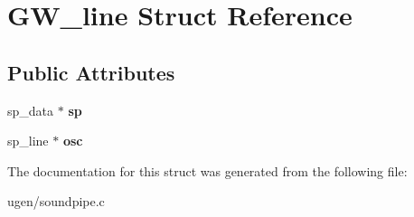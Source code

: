\hypertarget{structGW__line}{}\section{G\+W\+\_\+line Struct Reference}
\label{structGW__line}
\subsection*{Public Attributes}
\begin{DoxyCompactItemize}
\item 
\hypertarget{structGW__line_a1375b2661bb6d049fbfb6e8db5184e70}{}\label{structGW__line_a1375b2661bb6d049fbfb6e8db5184e70} 
sp\+\_\+data $\ast$ {\bfseries sp}
\item 
\hypertarget{structGW__line_a38864124a550d7c79fa44bad54ffc4ac}{}\label{structGW__line_a38864124a550d7c79fa44bad54ffc4ac} 
sp\+\_\+line $\ast$ {\bfseries osc}
\end{DoxyCompactItemize}


The documentation for this struct was generated from the following file\+:\begin{DoxyCompactItemize}
\item 
ugen/soundpipe.\+c\end{DoxyCompactItemize}
